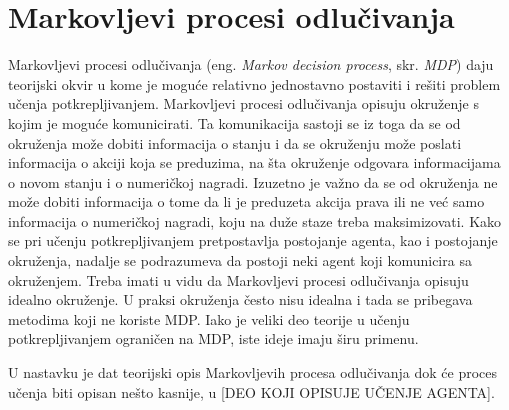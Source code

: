 \section{Markovljevi procesi odlučivanja}
\label{sec:mdp}

Markovljevi procesi odlučivanja (eng. {\em Markov decision process}, skr. {\em MDP}) daju teorijski okvir u kome je moguće relativno jednostavno postaviti i rešiti problem učenja potkrepljivanjem. Markovljevi procesi odlučivanja opisuju okruženje s kojim je moguće komunicirati. Ta komunikacija sastoji se iz toga da se od okruženja može dobiti informacija o stanju i da se okruženju može poslati informacija o akciji koja se preduzima, na šta okruženje odgovara informacijama o novom stanju i o numeričkoj nagradi. Izuzetno je važno da se od okruženja ne može dobiti informacija o tome da li je preduzeta akcija prava ili ne već samo informacija o numeričkoj nagradi, koju na duže staze treba maksimizovati. Kako se pri učenju potkrepljivanjem pretpostavlja postojanje agenta, kao i postojanje okruženja, nadalje se podrazumeva da postoji neki agent koji komunicira sa okruženjem. Treba imati u vidu da Markovljevi procesi odlučivanja opisuju idealno okruženje. U praksi okruženja često nisu idealna i tada se pribegava metodima koji ne koriste MDP. Iako je veliki deo teorije u učenju potkrepljivanjem ograničen na MDP, iste ideje imaju širu primenu.
\par 
U nastavku je dat teorijski opis Markovljevih procesa odlučivanja dok će proces učenja biti opisan nešto kasnije, u [DEO KOJI OPISUJE UČENJE AGENTA].


